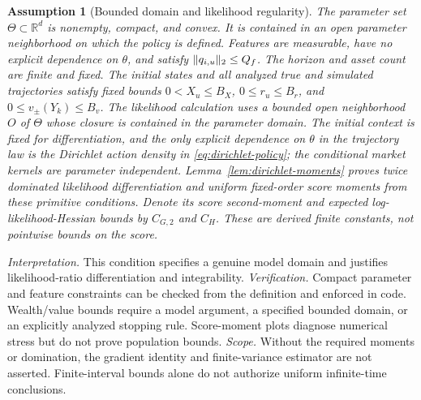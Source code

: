 \documentclass[11pt]{article}
\newtheorem{assumption}[theorem]{Assumption}
\newcommand{\R}{\mathbb R}
\newcommand{\1}{\mathbf 1}
\DeclarePairedDelimiter{\norm}{\lVert}{\rVert}
\newcommand{\assess}[3]{\par\noindent\emph{Interpretation.} #1 \emph{Verification.} #2 \emph{Scope.} #3\par}
\begin{document}
\begin{assumption}[Bounded domain and likelihood regularity]\label{ass:bounded}
The parameter set $\Theta\subset\R^d$ is nonempty, compact, and convex. It is contained in an open parameter neighborhood on which the policy is defined. Features are measurable, have no explicit dependence on $\theta$, and satisfy $\norm{q_{i,u}}_2\le Q_f$. The horizon and asset count are finite and fixed. The initial states and all analyzed true and simulated trajectories satisfy fixed bounds $0<X_u\le B_X$, $0\le r_u\le B_r$, and $0\le v_\pm(Y_k)\le B_v$. The likelihood calculation uses a bounded open neighborhood $O$ of $\Theta$ whose closure is contained in the parameter domain. The initial context is fixed for differentiation, and the only explicit dependence on $\theta$ in the trajectory law is the Dirichlet action density in \eqref{eq:dirichlet-policy}; the conditional market kernels are parameter independent. Lemma~\ref{lem:dirichlet-moments} proves twice dominated likelihood differentiation and uniform fixed-order score moments from these primitive conditions. Denote its score second-moment and expected log-likelihood-Hessian bounds by $C_{G,2}$ and $C_H$. These are derived finite constants, not pointwise bounds on the score.
\end{assumption}
\assess{This condition specifies a genuine model domain and justifies likelihood-ratio differentiation and integrability.}{Compact parameter and feature constraints can be checked from the definition and enforced in code. Wealth/value bounds require a model argument, a specified bounded domain, or an explicitly analyzed stopping rule. Score-moment plots diagnose numerical stress but do not prove population bounds.}{Without the required moments or domination, the gradient identity and finite-variance estimator are not asserted. Finite-interval bounds alone do not authorize uniform infinite-time conclusions.}
\end{document}
